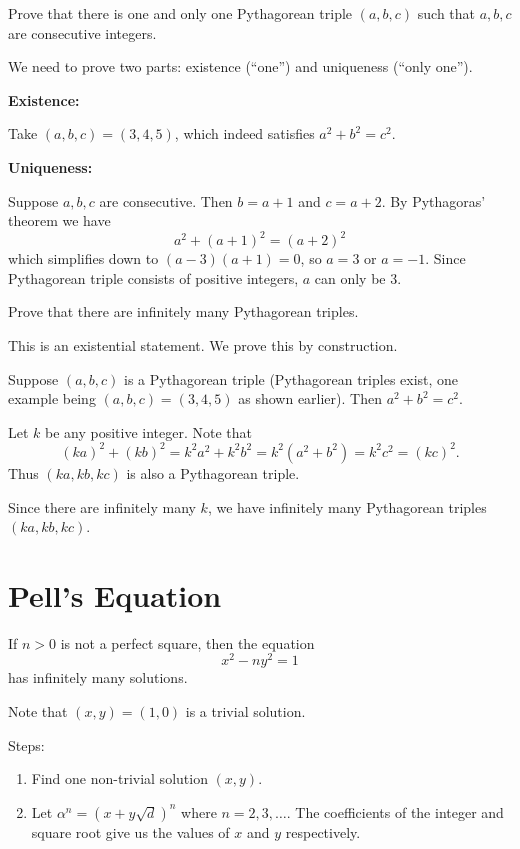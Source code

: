 \begin{exercise}
Prove that there is one and only one Pythagorean triple $(a,b,c)$ such that $a,b,c$ are consecutive integers.
\end{exercise}
\begin{solution}
We need to prove two parts: existence (``one'') and uniqueness (``only one'').

\textbf{Existence:}

Take $(a,b,c)=(3,4,5)$, which indeed satisfies $a^2+b^2=c^2$.

\textbf{Uniqueness:}

Suppose $a,b,c$ are consecutive. Then $b=a+1$ and $c=a+2$. By Pythagoras' theorem we have 
\[a^2+(a+1)^2=(a+2)^2\]
which simplifies down to $(a-3)(a+1)=0$, so $a=3$ or $a=-1$. Since Pythagorean triple consists of positive integers, $a$ can only be $3$.
\end{solution}

\begin{exercise}
Prove that there are infinitely many Pythagorean triples.
\end{exercise}
\begin{solution}
This is an existential statement. We prove this by construction.

Suppose $(a,b,c)$ is a Pythagorean triple (Pythagorean triples exist, one example being $(a,b,c)=(3,4,5)$ as shown earlier). Then $a^2+b^2=c^2$.

Let $k$ be any positive integer. Note that
\[(ka)^2+(kb)^2=k^2a^2+k^2b^2=k^2(a^2+b^2)=k^2c^2=(kc)^2.\]
Thus $(ka,kb,kc)$ is also a Pythagorean triple.

Since there are infinitely many $k$, we have infinitely many Pythagorean triples $(ka,kb,kc)$.
\end{solution}

\section{Pell's Equation}
\begin{theorem} 
If $n>0$ is not a perfect square, then the equation 
\[x^2-ny^2=1\]
has infinitely many solutions.
\end{theorem}
Note that $(x,y)=(1,0)$ is a trivial solution.

Steps:
\begin{enumerate}
	\item Find one non-trivial solution $(x,y)$.
	\item Let $\alpha^n = (x+y\sqrt{d})^n$ where $n=2,3,\dots$. The coefficients of the integer and square root give us the values of $x$ and $y$ respectively.
\end{enumerate}

